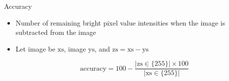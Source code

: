 \begin{frame}{Accuracy}
    \begin{itemize}
        \item Number of remaining bright pixel value intensities when the \usno image is subtracted from the \panstarrs image
        \item Let \usno image be $\text{xs}$, \panstarrs image $\text{ys}$, and $\text{zs} = \text{xs} - \text{ys}$

        \begin{equation}
            \text{accuracy} = 100 - \frac{|\text{zs} \in \{255\} | \times 100}{|\text{xs} \in \{255\} |}
        \end{equation}
    \end{itemize}
\end{frame}
